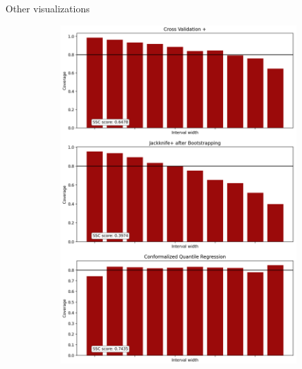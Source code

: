 \documentclass{beamer}
\begin{document}
\begin{frame}{Other visualizations}
\begin{figure}[ht]
\begin{subfigure}[b]{0.32\textwidth}
        \end{subfigure}
        \hfill
        \begin{subfigure}[b]{0.32\textwidth}
            \centering
            \includegraphics[width=\textwidth, height=1.9\textwidth]{Figures/regression/coverage-vs-width-regression-problem.png}

\end{subfigure}
\end{figure}
\end{frame}
\end{document}
